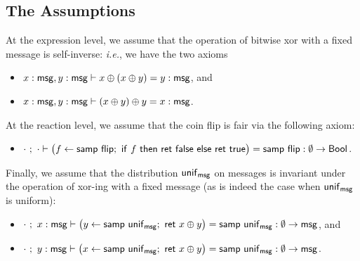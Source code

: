 \subsection{The Assumptions}
At the expression level, we assume that the operation of bitwise xor with a fixed message is self-inverse: \emph{i.e.}, we have the two axioms
\begin{itemize}
\item $x : \mathsf{msg}, y : \mathsf{msg} \vdash x \oplus (x \oplus y) = y : \mathsf{msg}$, and
\item $x : \mathsf{msg}, y : \mathsf{msg} \vdash (x \oplus y) \oplus y = x : \mathsf{msg}$.
\end{itemize}
At the reaction level, we assume that the coin flip is fair via the following axiom:
\begin{itemize}
\item $\cdot \ ; \ \cdot \vdash \big(f \leftarrow \mathsf{samp} \ \mathsf{flip}; \ \mathsf{if} \ f \ \mathsf{then} \ \mathsf{ret} \ \mathsf{false} \ \mathsf{else} \ \mathsf{ret} \ \mathsf{true}\big) = \mathsf{samp} \ \mathsf{flip} : \emptyset \to \mathsf{Bool}$.
\end{itemize}
Finally, we assume that the distribution $\mathsf{unif}_{\mathsf{msg}}$ on messages is invariant under the operation of xor-ing with a fixed message (as is indeed the case when $\mathsf{unif}_{\mathsf{msg}}$ is uniform):
\begin{itemize}
\item $\cdot \ ; \ x : \mathsf{msg} \vdash \big(y \leftarrow \mathsf{samp} \ \mathsf{unif}_{\mathsf{msg}}; \ \mathsf{ret} \ x \oplus y\big) = \mathsf{samp} \ \mathsf{unif}_{\mathsf{msg}} : \emptyset \to \mathsf{msg}$, and
\item $\cdot \ ; \ y : \mathsf{msg} \vdash \big(x \leftarrow \mathsf{samp} \ \mathsf{unif}_{\mathsf{msg}}; \ \mathsf{ret} \ x \oplus y\big) = \mathsf{samp} \ \mathsf{unif}_{\mathsf{msg}} : \emptyset \to \mathsf{msg}$.
\end{itemize}


